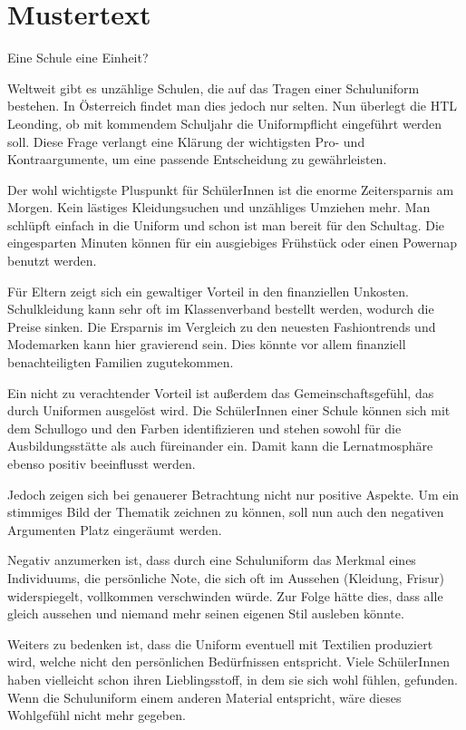 
\section{Mustertext}
Eine Schule  eine Einheit?  

Weltweit gibt es unzählige Schulen, die auf das Tragen einer Schuluniform bestehen. In Österreich findet man dies jedoch nur selten. Nun überlegt die HTL Leonding, ob mit kommendem Schuljahr die Uniformpflicht eingeführt werden soll. Diese Frage verlangt eine Klärung der wichtigsten Pro- und Kontraargumente, um eine passende Entscheidung zu gewährleisten. 

Der wohl wichtigste Pluspunkt für SchülerInnen ist die enorme Zeitersparnis am Morgen. Kein lästiges Kleidungsuchen und unzähliges Umziehen mehr. Man schlüpft einfach in die Uniform und schon ist man bereit für den Schultag. Die eingesparten Minuten können für ein ausgiebiges Frühstück oder einen Powernap benutzt werden.  

Für Eltern zeigt sich ein gewaltiger Vorteil in den finanziellen Unkosten. Schulkleidung kann sehr oft im Klassenverband bestellt werden, wodurch die Preise sinken. Die Ersparnis im Vergleich zu den neuesten Fashiontrends und Modemarken kann hier gravierend sein. Dies könnte vor allem finanziell benachteiligten Familien zugutekommen.  

Ein nicht zu verachtender Vorteil ist außerdem das Gemeinschaftsgefühl, das durch Uniformen ausgelöst wird. Die SchülerInnen einer Schule können sich mit dem Schullogo und den Farben identifizieren und stehen sowohl für die Ausbildungsstätte als auch füreinander ein. Damit kann die Lernatmosphäre ebenso positiv beeinflusst werden. 

Jedoch zeigen sich bei genauerer Betrachtung nicht nur positive Aspekte. Um ein stimmiges Bild der Thematik zeichnen zu können, soll nun auch den negativen Argumenten Platz eingeräumt werden.  

Negativ anzumerken ist, dass durch eine Schuluniform das Merkmal eines Individuums, die persönliche Note, die sich oft im Aussehen (Kleidung, Frisur) widerspiegelt, vollkommen verschwinden würde. Zur Folge hätte dies, dass alle gleich aussehen und niemand mehr seinen eigenen Stil ausleben könnte.  

Weiters zu bedenken ist, dass die Uniform eventuell mit Textilien produziert wird, welche nicht den persönlichen Bedürfnissen entspricht. Viele SchülerInnen haben vielleicht schon ihren Lieblingsstoff, in dem sie sich wohl fühlen, gefunden. Wenn die Schuluniform einem anderen Material entspricht, wäre dieses Wohlgefühl nicht mehr gegeben.  


